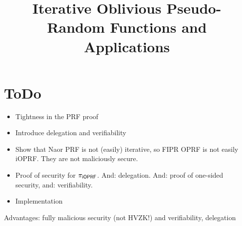 \documentclass{article}
\begin{document}
\title{Iterative Oblivious Pseudo-Random Functions and Applications}
\author{}\date{}
\maketitle

\section{ToDo}
\begin{itemize}
\item Tightness in the PRF proof
\item Introduce delegation and verifiability
\item Show that Naor PRF is not (easily) iterative, so FIPR OPRF is not easily iOPRF. They are not maliciously secure.
\item Proof of security for ${\pi_{\mathsf{i}\mathsf{OPRF}}}$. And: delegation. And: proof of one-sided security, and: verifiability.
\item Implementation
  
\end{itemize}

Advantages: fully malicious security (not HVZK!) and verifiability,
delegation








\end{document}
